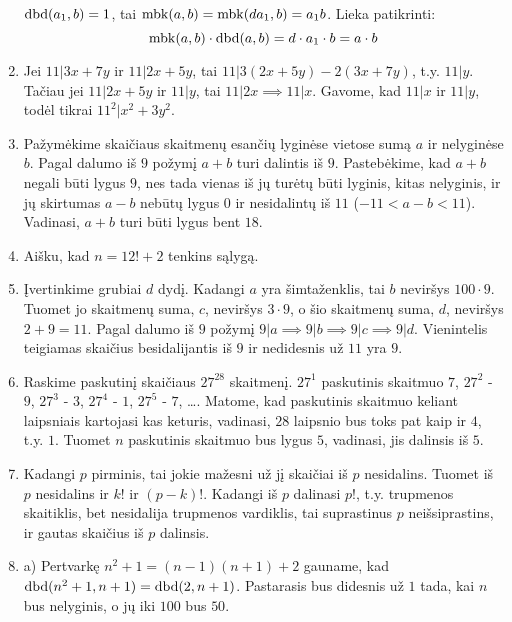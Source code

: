\begin{enumerate}
$\operatorname{dbd}(a_1,b) = 1$, tai $\operatorname{mbk}(a,b) = \operatorname{mbk}(da_1, b)=a_1b$. Lieka
patikrinti: $$\operatorname{mbk}(a,b)\cdot \operatorname{dbd}(a,b) = d \cdot a_1\cdot b = a\cdot b$$
\item 
Jei $11|3x+7y$ ir $11|2x+5y$, tai $11|3(2x+5y) - 2(3x + 7y)$, t.y.
$11|y$. Tačiau jei $11|2x+5y$ ir $11|y$, tai $11|2x \implies
11|x$. Gavome, kad $11|x$ ir $11|y$, todėl tikrai $11^2|x^2 + 3y^2$.
\item 
Pažymėkime skaičiaus skaitmenų esančių lyginėse vietose sumą
$a$ ir nelyginėse $b$. Pagal dalumo iš $9$ požymį $a+b$ turi dalintis
iš $9$. Pastebėkime, kad $a+b$ negali būti lygus $9$, nes tada vienas
iš jų turėtų būti lyginis, kitas nelyginis, ir jų skirtumas $a-b$
nebūtų lygus $0$ ir nesidalintų iš $11$ ($-11<a-b<11$). Vadinasi,
$a+b$ turi būti lygus bent $18$.
\item 
Aišku, kad $n=12! + 2$ tenkins sąlygą.
\item 
Įvertinkime grubiai $d$ dydį. Kadangi $a$ yra šimtaženklis, tai
$b$ neviršys $100\cdot 9$. Tuomet jo skaitmenų suma, $c$, neviršys
$3\cdot 9$, o šio skaitmenų suma, $d$, neviršys $2 + 9 = 11$.
Pagal dalumo iš $9$ požymį $9|a \implies 9|b \implies 9|c \implies
9|d$. Vienintelis teigiamas skaičius besidalijantis iš $9$ ir
nedidesnis už $11$ yra $9$.
\item 
Raskime paskutinį skaičiaus $27^{28}$ skaitmenį. $27^1$ paskutinis
skaitmuo $7$, $27^2$ - $9$, $27^3$ - $3$, $27^4$ - $1$, $27^5$ - $7$,
\dots. Matome, kad paskutinis skaitmuo keliant laipsniais kartojasi
kas keturis, vadinasi, $28$ laipsnio bus toks pat kaip ir $4$, t.y.
$1$. Tuomet $n$ paskutinis skaitmuo bus lygus $5$, vadinasi, jis
dalinsis iš $5$. 
\item 
Kadangi $p$ pirminis, tai jokie mažesni už jį skaičiai iš $p$
nesidalins. Tuomet iš $p$ nesidalins ir $k!$ ir $(p-k)!$. Kadangi iš
$p$ dalinasi $p!$, t.y. trupmenos skaitiklis, bet nesidalija trupmenos
vardiklis, tai suprastinus $p$ neišsiprastins, ir gautas skaičius iš
$p$ dalinsis.
\item 
a) Pertvarkę $n^2 + 1 = (n-1)(n+1) + 2$ gauname, kad $\operatorname{dbd}(n^2 + 1, n+1)
= \operatorname{dbd}(2, n+1)$. Pastarasis bus didesnis už $1$ tada, kai
$n$ bus nelyginis, o jų iki $100$ bus $50$.


\end{enumerate}
